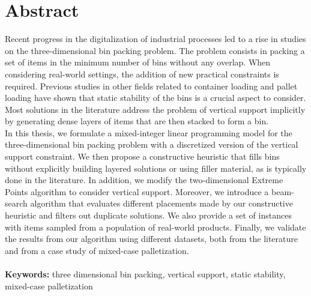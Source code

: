 
\chapter*{Abstract} 
Recent progress in the digitalization of industrial processes led to a rise in studies on the three-dimensional bin packing problem.
The problem consists in packing a set of items in the minimum number of bins without any overlap.
When considering real-world settings, the addition of new practical constraints is required.
Previous studies in other fields related to container loading and pallet loading have shown that static stability of the bins is a crucial aspect to consider.
Most solutions in the literature address the problem of vertical support implicitly by generating dense layers of items that are then stacked to form a bin.
\\
In this thesis, we formulate a mixed-integer linear programming model for the three-dimensional bin packing problem with a discretized version of the vertical support constraint.
We then propose a constructive heuristic that fills bins without explicitly building layered solutions or using filler material, as is typically done in the literature.
In addition, we modify the two-dimensional Extreme Points algorithm to consider vertical support.
Moreover, we introduce a beam-search algorithm that evaluates different placements made by our constructive heuristic and filters out duplicate solutions.
We also provide a set of instances with items sampled from a population of real-world products.
Finally, we validate the results from our algorithm using different datasets, both from the literature and from a case study of mixed-case palletization.
\\
\\
\textbf{Keywords:} three dimensional bin packing, vertical support, static stability, mixed-case palletization